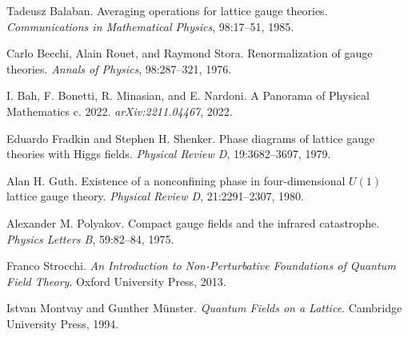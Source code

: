 \documentclass[11pt]{amsart}
\theoremstyle{plain}
\theoremstyle{definition}
\theoremstyle{remark}
\begin{document}
\begin{thebibliography}{99}
Tadeusz Balaban.
Averaging operations for lattice gauge theories.
\emph{Communications in Mathematical Physics}, 98:17--51, 1985.

Carlo Becchi, Alain Rouet, and Raymond Stora.
Renormalization of gauge theories.
\emph{Annals of Physics}, 98:287--321, 1976.

I. Bah, F. Bonetti, R. Minasian, and E. Nardoni.
A Panorama of Physical Mathematics c. 2022.
\emph{arXiv:2211.04467}, 2022.

Eduardo Fradkin and Stephen H. Shenker.
Phase diagrams of lattice gauge theories with Higgs fields.
\emph{Physical Review D}, 19:3682--3697, 1979.

Alan H. Guth.
Existence of a nonconfining phase in four-dimensional $U(1)$ lattice gauge theory.
\emph{Physical Review D}, 21:2291--2307, 1980.

Alexander M. Polyakov.
Compact gauge fields and the infrared catastrophe.
\emph{Physics Letters B}, 59:82--84, 1975.

Franco Strocchi.
\emph{An Introduction to Non-Perturbative Foundations of Quantum Field Theory}.
Oxford University Press, 2013.

Istvan Montvay and Gunther Münster.
\emph{Quantum Fields on a Lattice}.
Cambridge University Press, 1994.

\end{thebibliography}
\end{document}
